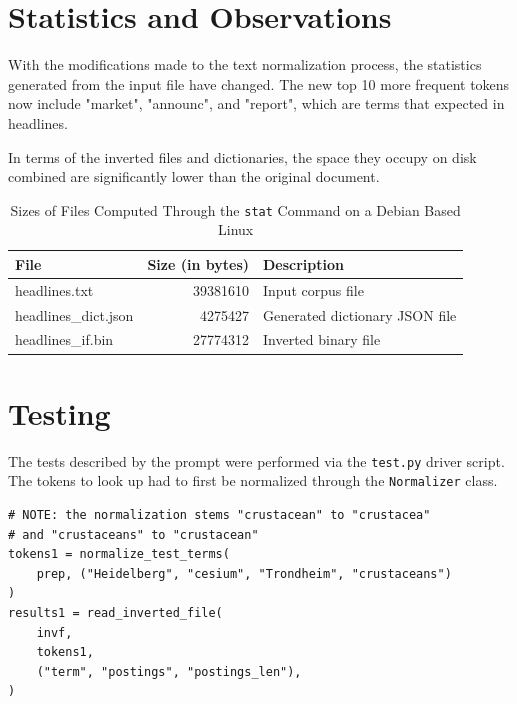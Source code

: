 \documentclass[11pt]{article}
\begin{document}
\section{Statistics and Observations}
With the modifications made to the text normalization process, the statistics generated from the input file have changed. The new top 10 more frequent tokens now include "market", "announc", and "report", which are terms that expected in headlines.

In terms of the inverted files and dictionaries, the space they occupy on disk combined are significantly lower than the original document.

\begin{table}[h]
    \begin{center}
        
        \begin{tabular}{| l | r | l |}
        \hline
        \textbf{File} & \textbf{Size (in bytes)} & \textbf{Description} \\
        \hline
        headlines.txt & 39381610 & Input corpus file \\
        headlines\_dict.json & 4275427 & Generated dictionary JSON file \\
        headlines\_if.bin & 27774312 & Inverted binary file \\
        \hline
        \end{tabular}

    \end{center}
    \caption{Sizes of Files Computed Through the \texttt{stat} Command on a Debian Based Linux}

\end{table}

\section{Testing}
The tests described by the prompt were performed via the \texttt{test.py} driver script. The tokens to look up had to first be normalized through the \texttt{Normalizer} class.

\begin{lstlisting}[style=mypython,
    caption=Test 1: Document frequency and postings list for the terms: "Heidelberg"\, "cesium"\, "Trondheim"\, "crustacean"]
# NOTE: the normalization stems "crustacean" to "crustacea"
# and "crustaceans" to "crustacean"
tokens1 = normalize_test_terms(
    prep, ("Heidelberg", "cesium", "Trondheim", "crustaceans")
)
results1 = read_inverted_file(
    invf,
    tokens1,
    ("term", "postings", "postings_len"),
)
\end{lstlisting}
\end{document}
